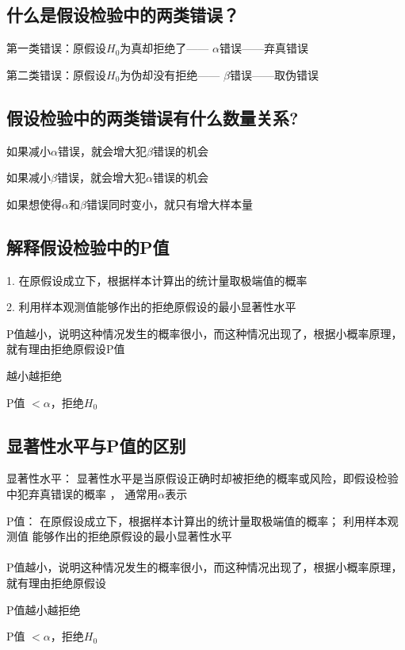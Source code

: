 \documentclass[UTF8,10pt]{book}
\begin{document}
{{    \subsection{什么是假设检验中的两类错误？}	
    第一类错误：原假设$H_0$为真却拒绝了—— $ \alpha $错误——弃真错误 
    
    第二类错误：原假设$H_0$为伪却没有拒绝—— $ \beta $错误——取伪错误

    \subsection{假设检验中的两类错误有什么数量关系?}	
    如果减小$\alpha$错误，就会增大犯$\beta$错误的机会
    
    如果减小$\beta$错误，就会增大犯$\alpha$错误的机会 
    
    如果想使得$\alpha$和$\beta$错误同时变小，就只有增大样本量

    \subsection{解释假设检验中的P值}	
    1. 在原假设成立下，根据样本计算出的统计量取极端值的概率 
    
    2. 利用样本观测值能够作出的拒绝原假设的最小显著性水平 
    
    P值越小，说明这种情况发生的概率很小，而这种情况出现了，根据小概率原理，
    就有理由拒绝原假设P值
    
    越小越拒绝
    
    P值 $< \alpha$，拒绝$H_0$

    \subsection{显著性水平与P值的区别}	
    显著性水平： 显著性水平是当原假设正确时却被拒绝的概率或风险，即假设检验中犯弃真错误的概率  ，   通常用$\alpha$表示 
    
    P值：    在原假设成立下，根据样本计算出的统计量取极端值的概率；    利用样本观测值 能够作出的拒绝原假设的最小显著性水平 \\
    \\
    
    P值越小，说明这种情况发生的概率很小，而这种情况出现了，根据小概率原理，
    就有理由拒绝原假设
    
    P值越小越拒绝
    
    P值 $ < \alpha$，拒绝$H_0$ \\
    \\
    
}}
\end{document}
